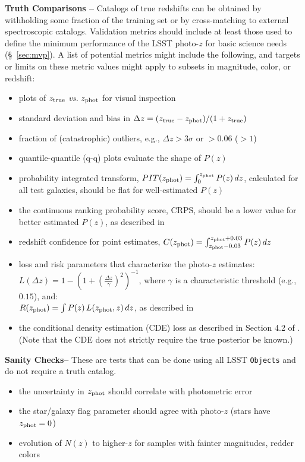 \documentclass[DM,lsstdraft,toc]{lsstdoc}
\begin{document}
{\bf Truth Comparisons --} 
Catalogs of true redshifts can be obtained by withholding some fraction of the training set or by cross-matching to external spectroscopic catalogs. Validation metrics should include at least those used to define the minimum performance of the LSST photo-$z$ for basic science needs (\S~\ref{sec:mvp}). A list of potential metrics might include the following, and targets or limits on these metric values might apply to subsets in magnitude, color, or redshift: 
\vspace{-15pt}
\begin{itemize}
\item plots of $z_{\rm true}$ {\it vs.} $z_{\rm phot}$ for visual inspection
\item standard deviation and bias in $\Delta z = (z_{\rm true}-z_{\rm phot})/(1+z_{\rm true})$
\item fraction of (catastrophic) outliers, e.g., $\Delta z > 3\sigma$ or $>0.06$ ($>1$)
\item quantile-quantile (q-q) plots evaluate the shape of $P(z)$
\item probability integrated transform, $PIT(z_{\rm phot}) = \int_{0}^{z_{\rm phot}} P(z)\,dz$, calculated for all test galaxies, should be flat for well-estimated $P(z)$ \citep{2016arXiv160808016P}
\item the continuous ranking probability score, CRPS, should be a lower value for better estimated $P(z)$, as described in \citep{2016arXiv160808016P}
\item redshift confidence for point estimates, $C(z_{\rm phot}) = \int_{z_{\rm phot}-0.03}^{z_{\rm phot}+0.03} P(z)\,dz $
\item loss and risk parameters that characterize the photo-$z$ estimates:\\
$L(\Delta z) = 1 - \left(1+ \left(\frac{\Delta z}{\gamma} \right)^2 \right)^{-1}$, 
where $\gamma$ is a characteristic threshold (e.g., $0.15$), and:\\
$R(z_{\rm phot}) = \int P(z)\,L(z_{\rm phot},z)\,dz$, as described in \citet{2018PASJ...70S...9T}
\item the conditional density estimation (CDE) loss as described in Section 4.2 of \citet{2020arXiv200103621S}. (Note that the CDE does not strictly require the true posterior be known.)
\end{itemize}

{\bf Sanity Checks--} 
These are tests that can be done using all LSST {\tt Objects} and do not require a truth catalog.
\vspace{-15pt}
\begin{itemize}
\item the uncertainty in $z_{\rm phot}$ should correlate with photometric error
\item the star/galaxy flag parameter should agree with photo-$z$ (stars have $z_{\rm phot}=0$)
\item evolution of $N(z)$ to higher-$z$ for samples with fainter magnitudes, redder colors
\end{itemize}
\end{document}

